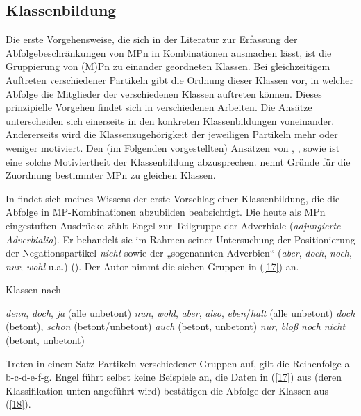 \subsection{Klassenbildung}
Die erste Vorgehensweise, die sich in der Literatur zur Erfassung der Abfolgebeschränkungen von MPn in Kombinationen ausmachen lässt, ist die Gruppierung von (M)Pn zu einander geordneten Klassen. Bei gleichzeitigem Auf\-treten verschiedener Partikeln gibt die Ordnung dieser Klassen vor, in welcher Abfolge die Mitglieder der verschiedenen Klassen auftreten können. Dieses prin\-zipielle Vorgehen findet sich in verschiedenen Arbeiten. Die Ansätze unterscheiden sich einerseits in den konkreten Klassenbildungen voneinander. Andererseits wird die Klassenzugehörigkeit der jeweiligen Partikeln mehr oder weniger motiviert. Den (im Folgenden vorgestellten) Ansätzen von \citet{Engel1968}, \citet{Helbig1981}, \citet{Helbig1990} sowie \citet{Helbig1999} ist eine solche Motiviertheit der Klassenbildung abzusprechen. \citet{Thurmair1991} nennt Gründe für die Zuordnung bestimmter MPn zu gleichen Klassen. 

In \citet{Engel1968} findet sich meines Wissens der erste Vorschlag  einer Klassenbildung, die die Abfolge in MP-Kom\-bi\-na\-ti\-on\-en abzubilden beabsichtigt. Die heute als MPn eingestuften Ausdrücke zählt Engel zur Teilgruppe der Adverbiale (\textit{adjungierte Adverbialia}). Er behandelt sie im Rahmen seiner Untersuchung der Positionierung der Negationspartikel \textit{nicht} sowie der „sogenannten Adverbien“ (\textit{aber}, \textit{doch}, \textit{noch}, \textit{nur}, \textit{wohl} u.a.) (\citealt[85]{Engel1968}). Der Autor nimmt die sieben Gruppen in (\ref{17}) an.

\begin{exe}
	\ex\label{17} 
		Klassen nach \citet[91--94]{Engel1968}
	\begin{xlist}	
		\ex\label{17a} \textit{denn}, \textit{doch}, \textit{ja} (alle unbetont)
		\ex\label{17b} \textit{nun}, \textit{wohl}, \textit{aber}, \textit{also}, \textit{eben}/\textit{halt} (alle unbetont)
		\ex\label{17c} \textit{doch} (betont), \textit{schon} (betont/unbetont)
		\ex\label{17d} \textit{auch} (betont, unbetont)
		\ex\label{17e} \textit{nur}, \textit{bloß}
		\ex\label{17f} \textit{noch}
		\ex\label{17g} \textit{nicht} (betont, unbetont)
	\end{xlist}	
\end{exe}
Treten in einem Satz Partikeln verschiedener Gruppen auf, gilt die Reihenfolge a-b-c-d-e-f-g. Engel führt selbst keine Beispiele an, die Daten in (\ref{17}) aus \citet{Helbig1981} (deren Klassifikation unten angeführt wird) bestätigen die Abfolge der Klassen aus (\ref{18}). 

